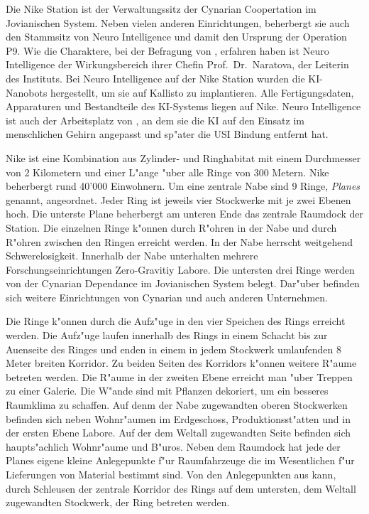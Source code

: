 
Die Nike Station ist der Verwaltungssitz der Cynarian Coopertation im Jovianischen System. Neben vielen anderen Einrichtungen, beherbergt sie auch den Stammsitz von Neuro Intelligence und damit den Ursprung der Operation P9. Wie die Charaktere, bei der Befragung von \ml{}, erfahren haben ist Neuro Intelligence der Wirkungsbereich ihrer Chefin Prof.~Dr.~Naratova, der Leiterin des Instituts. Bei Neuro Intelligence auf der Nike Station wurden die KI-Nanobots hergestellt, um sie auf Kallisto zu implantieren. Alle Fertigungsdaten, Apparaturen und Bestandteile des KI-Systems liegen auf Nike. Neuro Intelligence ist auch der Arbeitsplatz von \ml{}, an dem sie die KI auf den Einsatz im menschlichen Gehirn angepasst und sp"ater die USI Bindung entfernt hat.

Nike ist eine Kombination aus Zylinder- und Ringhabitat mit einem Durchmesser von 2 Kilometern und einer L"ange "uber alle Ringe von 300 Metern. Nike beherbergt rund 40'000 Einwohnern. Um eine zentrale Nabe sind 9 Ringe, \emph{Planes} genannt, angeordnet. Jeder Ring ist jeweils vier Stockwerke mit je zwei Ebenen hoch. Die unterste Plane beherbergt am unteren Ende das zentrale Raumdock der Station.  Die einzelnen Ringe k"onnen durch R"ohren in der Nabe und durch R"ohren zwischen den Ringen erreicht werden. In der Nabe herrscht weitgehend Schwerelosigkeit. Innerhalb der Nabe unterhalten mehrere Forschungseinrichtungen Zero-Gravitiy Labore. Die untersten drei Ringe werden von der Cynarian Dependance im Jovianischen System belegt. Dar"uber befinden sich weitere Einrichtungen von Cynarian und auch anderen Unternehmen.

Die Ringe k"onnen durch die Aufz"uge in den vier Speichen des Rings erreicht werden. Die Aufz"uge laufen innerhalb des Rings in einem Schacht bis zur Au\3enseite des Ringes und enden in einem in jedem Stockwerk umlaufenden 8 Meter breiten Korridor. Zu beiden Seiten des Korridors k"onnen weitere R"aume betreten werden. Die R"aume in der zweiten Ebene erreicht man "uber Treppen zu einer Galerie. Die W"ande sind mit Pflanzen dekoriert, um ein besseres Raumklima zu schaffen. Auf denm der Nabe zugewandten oberen Stockwerken befinden sich neben Wohnr"aumen im Erdgeschoss, Produktionsst"atten und in der ersten Ebene Labore. Auf der dem Weltall zugewandten Seite befinden sich haupts"achlich Wohnr"aume und B"uros. Neben dem Raumdock hat jede der Planes eigene kleine Anlegepunkte f"ur Raumfahrzeuge die im Wesentlichen f"ur Lieferungen von Material bestimmt sind. Von den Anlegepunkten aus kann, durch Schleusen der zentrale Korridor des Rings auf dem untersten, dem Weltall zugewandten Stockwerk, der Ring betreten werden.

